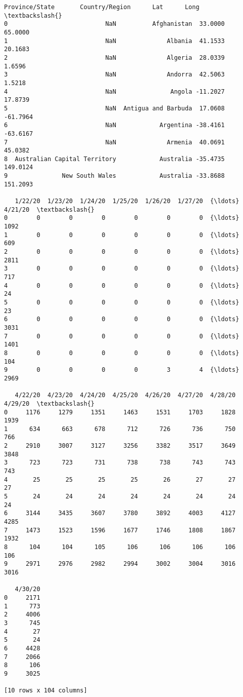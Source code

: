 \documentclass[11pt]{article}
\newcommand{\prompt}[4]{
        \llap{{\color{#2}[#3]: #4}}\vspace{-1.25em}
    }
\begin{document}
            \begin{tcolorbox}[breakable, boxrule=.5pt, size=fbox, pad at break*=1mm, opacityfill=0]
\prompt{Out}{outcolor}{4}{\hspace{3.5pt}}
\begin{Verbatim}[commandchars=\\\{\}]
                 Province/State       Country/Region      Lat      Long  \textbackslash{}
0                           NaN          Afghanistan  33.0000   65.0000
1                           NaN              Albania  41.1533   20.1683
2                           NaN              Algeria  28.0339    1.6596
3                           NaN              Andorra  42.5063    1.5218
4                           NaN               Angola -11.2027   17.8739
5                           NaN  Antigua and Barbuda  17.0608  -61.7964
6                           NaN            Argentina -38.4161  -63.6167
7                           NaN              Armenia  40.0691   45.0382
8  Australian Capital Territory            Australia -35.4735  149.0124
9               New South Wales            Australia -33.8688  151.2093

   1/22/20  1/23/20  1/24/20  1/25/20  1/26/20  1/27/20  {\ldots}  4/21/20  \textbackslash{}
0        0        0        0        0        0        0  {\ldots}     1092
1        0        0        0        0        0        0  {\ldots}      609
2        0        0        0        0        0        0  {\ldots}     2811
3        0        0        0        0        0        0  {\ldots}      717
4        0        0        0        0        0        0  {\ldots}       24
5        0        0        0        0        0        0  {\ldots}       23
6        0        0        0        0        0        0  {\ldots}     3031
7        0        0        0        0        0        0  {\ldots}     1401
8        0        0        0        0        0        0  {\ldots}      104
9        0        0        0        0        3        4  {\ldots}     2969

   4/22/20  4/23/20  4/24/20  4/25/20  4/26/20  4/27/20  4/28/20  4/29/20  \textbackslash{}
0     1176     1279     1351     1463     1531     1703     1828     1939
1      634      663      678      712      726      736      750      766
2     2910     3007     3127     3256     3382     3517     3649     3848
3      723      723      731      738      738      743      743      743
4       25       25       25       25       26       27       27       27
5       24       24       24       24       24       24       24       24
6     3144     3435     3607     3780     3892     4003     4127     4285
7     1473     1523     1596     1677     1746     1808     1867     1932
8      104      104      105      106      106      106      106      106
9     2971     2976     2982     2994     3002     3004     3016     3016

   4/30/20
0     2171
1      773
2     4006
3      745
4       27
5       24
6     4428
7     2066
8      106
9     3025

[10 rows x 104 columns]
\end{Verbatim}
\end{tcolorbox}
        
\end{document}
